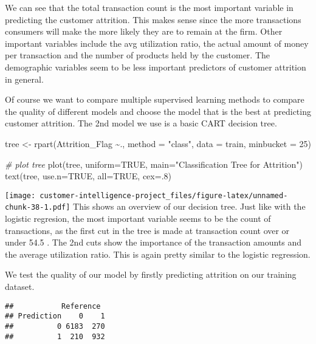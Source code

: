 \documentclass[
]{article}
\newenvironment{Shaded}{\begin{snugshade}}{\end{snugshade}}
\newcommand{\AttributeTok}[1]{\textcolor[rgb]{0.77,0.63,0.00}{#1}}
\newcommand{\CommentTok}[1]{\textcolor[rgb]{0.56,0.35,0.01}{\textit{#1}}}
\newcommand{\ConstantTok}[1]{\textcolor[rgb]{0.00,0.00,0.00}{#1}}
\newcommand{\DecValTok}[1]{\textcolor[rgb]{0.00,0.00,0.81}{#1}}
\newcommand{\FunctionTok}[1]{\textcolor[rgb]{0.00,0.00,0.00}{#1}}
\newcommand{\NormalTok}[1]{#1}
\newcommand{\OtherTok}[1]{\textcolor[rgb]{0.56,0.35,0.01}{#1}}
\newcommand{\SpecialCharTok}[1]{\textcolor[rgb]{0.00,0.00,0.00}{#1}}
\newcommand{\StringTok}[1]{\textcolor[rgb]{0.31,0.60,0.02}{#1}}
\begin{document}
We can see that the total transaction count is the most important
variable in predicting the customer attrition. This makes sense since
the more transactions consumers will make the more likely they are to
remain at the firm. Other important variables include the avg
utilization ratio, the actual amount of money per transaction and the
number of products held by the customer. The demographic variables seem
to be less important predictors of customer attrition in general.

Of course we want to compare multiple supervised learning methods to
compare the quality of different models and choose the model that is the
best at predicting customer attrition. The 2nd model we use is a basic
CART decision tree.

\begin{Shaded}
\begin{Highlighting}[]
\NormalTok{tree }\OtherTok{\textless{}{-}} \FunctionTok{rpart}\NormalTok{(Attrition\_Flag }\SpecialCharTok{\textasciitilde{}}\NormalTok{., }\AttributeTok{method =} \StringTok{"class"}\NormalTok{, }\AttributeTok{data =}\NormalTok{ train, }\AttributeTok{minbucket =} \DecValTok{25}\NormalTok{)}

\CommentTok{\# plot tree}
\FunctionTok{plot}\NormalTok{(tree, }\AttributeTok{uniform=}\ConstantTok{TRUE}\NormalTok{,}
   \AttributeTok{main=}\StringTok{"Classification Tree for Attrition"}\NormalTok{)}
\FunctionTok{text}\NormalTok{(tree, }\AttributeTok{use.n=}\ConstantTok{TRUE}\NormalTok{, }\AttributeTok{all=}\ConstantTok{TRUE}\NormalTok{, }\AttributeTok{cex=}\NormalTok{.}\DecValTok{8}\NormalTok{)}
\end{Highlighting}
\end{Shaded}

\texttt{[image: customer-intelligence-project\_files/figure-latex/unnamed-chunk-38-1.pdf]}
This shows an overview of our decision tree. Just like with the logistic
regresion, the most important variable seems to be the count of
transactions, as the first cut in the tree is made at transaction count
over or under 54.5 . The 2nd cuts show the importance of the transaction
amounts and the average utilization ratio. This is again pretty similar
to the logistic regression.

We test the quality of our model by firstly predicting attrition on our
training dataset.

\begin{verbatim}
##           Reference
## Prediction    0    1
##          0 6183  270
##          1  210  932
\end{verbatim}
\end{document}

